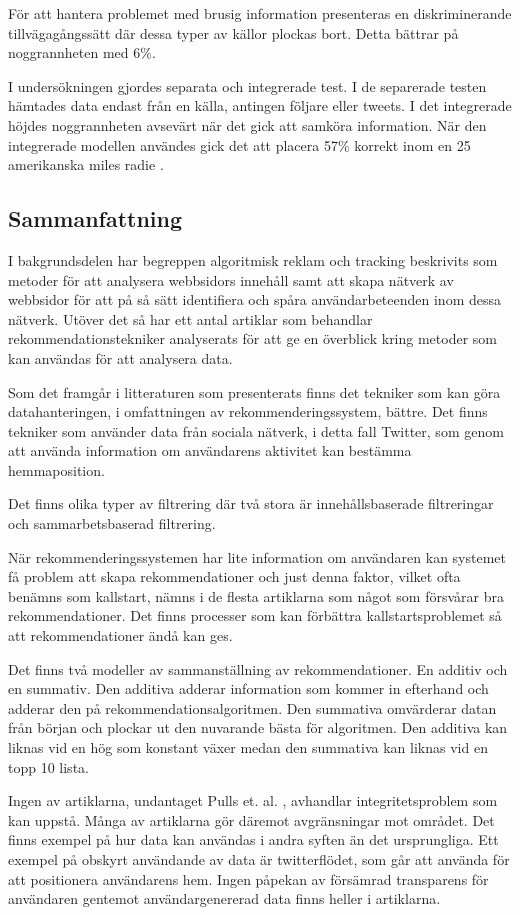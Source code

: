 \documentclass[a4paper,11pt]{article}
\begin{document}
{För att hantera problemet med brusig information presenteras en diskriminerande tillvägagångssätt där dessa typer av källor plockas bort. Detta bättrar på noggrannheten med 6\%.

I undersökningen gjordes separata och integrerade test. I de separerade testen hämtades data endast från en källa, antingen följare eller tweets. I det integrerade höjdes noggrannheten avsevärt när det gick att samköra information. När den integrerade modellen användes gick det att placera 57\% korrekt inom en 25 amerikanska miles radie \cite{Rui}.   

\subsection{Sammanfattning}
I bakgrundsdelen har begreppen algoritmisk reklam och tracking beskrivits som metoder för att analysera webbsidors innehåll samt att skapa nätverk av webbsidor för att på så sätt  identifiera och spåra användarbeteenden inom dessa nätverk. Utöver det så har ett antal artiklar som behandlar rekommendationstekniker analyserats för att ge en överblick kring metoder som kan användas för att analysera data.

Som det framgår i litteraturen som presenterats finns det tekniker som kan göra datahanteringen, i omfattningen av rekommenderingssystem, bättre. Det finns tekniker som använder data från sociala nätverk, i detta fall Twitter, som genom att använda information om användarens aktivitet kan bestämma hemmaposition. 

Det finns olika typer av filtrering där två stora är innehållsbaserade filtreringar och sammarbetsbaserad filtrering. 

När rekommenderingssystemen har lite information om användaren kan systemet få problem att skapa rekommendationer och just denna faktor, vilket ofta benämns som kallstart, nämns i de flesta artiklarna som något som försvårar bra rekommendationer. Det finns processer som kan förbättra kallstartsproblemet så att rekommendationer ändå kan ges. 

Det finns två modeller av sammanställning av rekommendationer. En additiv och en summativ. Den additiva adderar information som kommer in efterhand och adderar den på rekommendationsalgoritmen. Den summativa omvärderar datan från början och plockar ut den nuvarande bästa för algoritmen. Den additiva kan liknas vid en hög som konstant växer medan den summativa kan liknas vid en topp 10 lista. 


Ingen av artiklarna, undantaget Pulls et. al. \cite{Pulls}, avhandlar integritetsproblem som kan uppstå. Många av artiklarna gör däremot avgränsningar mot området. Det finns exempel på hur data kan användas i andra syften än det ursprungliga. Ett exempel på obskyrt användande av data är twitterflödet, som går att använda för att positionera användarens hem. Ingen påpekan av försämrad transparens för användaren gentemot användargenererad data finns heller i artiklarna. 

}
\end{document}
